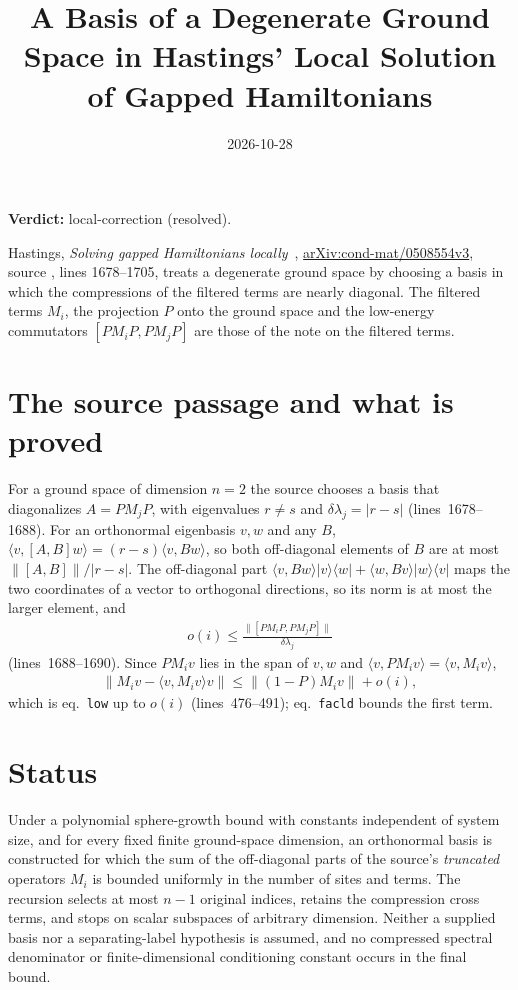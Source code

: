 \documentclass{article}
\title{A Basis of a Degenerate Ground Space in Hastings' Local Solution
  of Gapped Hamiltonians}
\author{}
\date{2026-10-28}
\providecommand{\gapnote}[2]{\par\noindent\textbf{Verdict:} #1 (#2).\par}
\begin{document}
\maketitle
\gapnote{local-correction}{resolved}

Hastings, \emph{Solving gapped Hamiltonians locally}~\cite{Hastings2006Solving},
\href{https://arxiv.org/abs/cond-mat/0508554v3}{arXiv:cond-mat/0508554v3},
source , lines 1678--1705, treats a degenerate ground space
by choosing a basis in which the compressions of the filtered terms are nearly
diagonal. The filtered terms $M_i$, the projection $P$ onto the ground space
and the low-energy commutators $[PM_iP,PM_jP]$ are those of the note
 on the filtered terms.

\section{The source passage and what is proved}

For a ground space of dimension $n=2$ the source chooses a basis that
diagonalizes $A=PM_jP$, with eigenvalues $r\ne s$ and
$\delta\lambda_j=|r-s|$ (lines~1678--1688). For an orthonormal eigenbasis
$v,w$ and any $B$, $\langle v,[A,B]w\rangle=(r-s)\langle v,Bw\rangle$, so
both off-diagonal elements of $B$ are at most $\lVert[A,B]\rVert/|r-s|$. The
off-diagonal part
$\langle v,Bw\rangle\lvert v\rangle\langle w\rvert
+\langle w,Bv\rangle\lvert w\rangle\langle v\rvert$ maps the two
coordinates of a vector to orthogonal directions, so its norm is at most the
larger element, and
\begin{align}
  o(i)\le\frac{\lVert[PM_iP,PM_jP]\rVert}{\delta\lambda_j}
  \label{eq:hastings05_two_dim_ground_basis_oi}
\end{align}
(lines~1688--1690). Since $PM_iv$ lies in the span of $v,w$ and
$\langle v,PM_iv\rangle=\langle v,M_iv\rangle$,
\begin{align}
  \lVert M_iv-\langle v,M_iv\rangle v\rVert
  \le\lVert(1-P)M_iv\rVert+o(i),
  \label{eq:hastings05_two_dim_ground_basis_low}
\end{align}
which is eq.~\texttt{low} up to $o(i)$ (lines~476--491); eq.~\texttt{facld}
bounds the first term.

\section{Status}

Under a polynomial sphere-growth bound with constants independent of system
size, and for every fixed finite ground-space dimension, an orthonormal basis is
constructed for which the sum of the off-diagonal parts of the source's
\emph{truncated} operators $M_i$ is bounded uniformly in the number of sites and
terms. The recursion selects at most $n-1$ original indices, retains the
compression cross terms, and stops on scalar subspaces of arbitrary dimension.
Neither a supplied basis nor a separating-label hypothesis is assumed, and no
compressed spectral denominator or finite-dimensional conditioning constant
occurs in the final bound.
\end{document}

